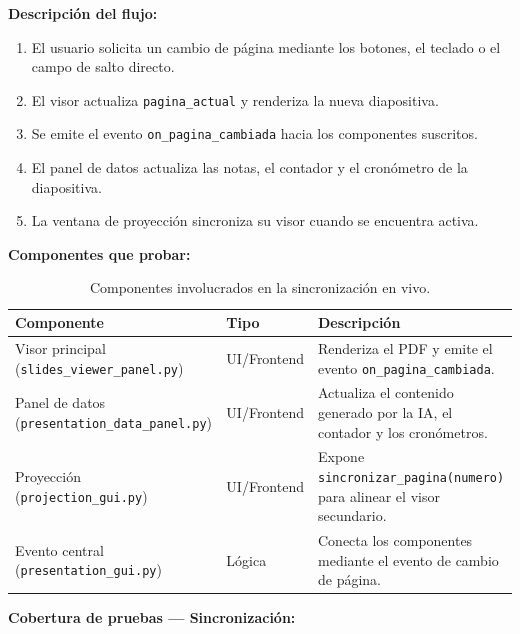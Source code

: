 \documentclass[11pt]{article}
\begin{document}
\textbf{Descripción del flujo:}
\begin{enumerate}
    \item El usuario solicita un cambio de página mediante los botones, el teclado o el campo de salto directo.
    \item El visor actualiza \texttt{pagina\_actual} y renderiza la nueva diapositiva.
    \item Se emite el evento \texttt{on\_pagina\_cambiada} hacia los componentes suscritos.
    \item El panel de datos actualiza las notas, el contador y el cronómetro de la diapositiva.
    \item La ventana de proyección sincroniza su visor cuando se encuentra activa.
\end{enumerate}

\clearpage
\textbf{Componentes que probar:}

\begin{table}[H]
    \centering
    \begin{tabular}{|L{0.34\textwidth}|L{0.18\textwidth}|L{0.38\textwidth}|}
        \hline
        \textbf{Componente} & \textbf{Tipo} & \textbf{Descripción} \\ \hline
        Visor principal (\texttt{slides\_viewer\_panel.py}) & UI/Frontend & Renderiza el PDF y emite el evento \texttt{on\_pagina\_cambiada}. \\ \hline
        Panel de datos (\texttt{presentation\_data\_panel.py}) & UI/Frontend & Actualiza el contenido generado por la IA, el contador y los cronómetros. \\ \hline
        Proyección (\texttt{projection\_gui.py}) & UI/Frontend & Expone \texttt{sincronizar\_pagina(numero)} para alinear el visor secundario. \\ \hline
        Evento central (\texttt{presentation\_gui.py}) & Lógica & Conecta los componentes mediante el evento de cambio de página. \\ \hline
    \end{tabular}
    \caption{Componentes involucrados en la sincronización en vivo.}
    \label{tab:componentes-modulo-sincronizacion}
\end{table}

\textbf{Cobertura de pruebas --- Sincronización:}
\end{document}
